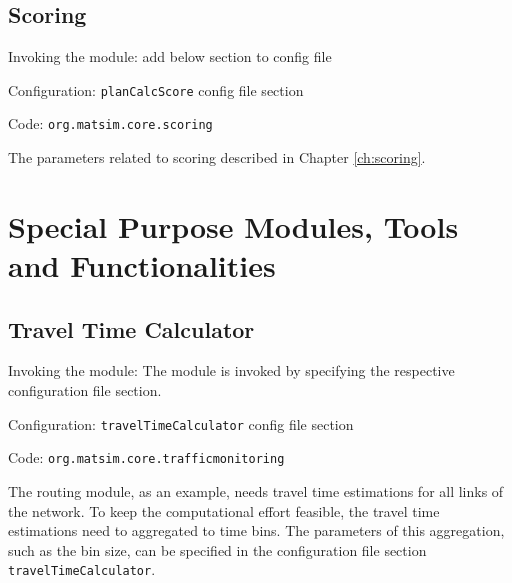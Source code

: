 \subsection{Scoring}
\label{sec:scoring}
\begin{compactitem}
\item Invoking the module: add below section to config file
\item Configuration: \lstinline|planCalcScore| config file section
\item Code: \lstinline|org.matsim.core.scoring|
\end{compactitem}

The parameters related to scoring described in Chapter \ref{ch:scoring}.


\section{Special Purpose Modules, Tools and Functionalities}
\label{sec:specialpurpose}

\subsection{Travel Time Calculator}
\label{sec:ttc}
\begin{compactitem}
\item Invoking the module: The module is invoked by specifying the respective configuration file section.
\item Configuration: \lstinline|travelTimeCalculator| config file section
\item Code: \lstinline|org.matsim.core.trafficmonitoring|
\end{compactitem}

The routing module, as an example, needs travel time estimations for all links of the network. To keep the computational effort feasible, the travel time estimations need to aggregated to time bins. The parameters of this aggregation, such as the bin size, can be specified in the configuration file section \lstinline|travelTimeCalculator|.

